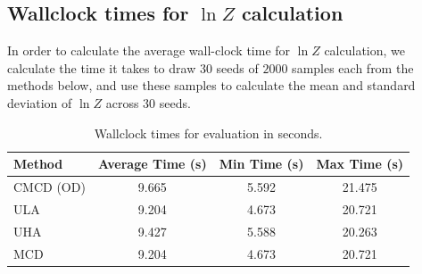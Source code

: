 \subsection{Wallclock times for \texorpdfstring{$\ln Z$}{ln Z} calculation}
In order to calculate the average wall-clock time for $\ln Z$ calculation, we calculate the time it takes to draw $30$ seeds of $2000$ samples each from the methods below, and use these samples to calculate the mean and standard deviation of $\ln Z$ across $30$ seeds.
\begin{table}[!htb]
    \centering
    \begin{tabular}{lccc}
\toprule Method & Average Time (s) & Min Time (s) & Max Time (s) \\
\midrule CMCD (OD) & 9.665 & 5.592 & 21.475 \\
 ULA & 9.204 & 4.673 & 20.721 \\
 UHA & 9.427 & 5.588 & 20.263 \\
 MCD & 9.204 & 4.673 & 20.721  \\
\bottomrule
\end{tabular}
    \caption{Wallclock times for evaluation in seconds.}
    \label{tab:my_label}
\end{table}


\begin{table}[!htb]
\centering
{}
\caption[Sampling and loss calculation complexity across SDE based methods]{Sampling and loss calculation complexity across SDE based methods,  $K$ represents the number of integration steps, $G(d)$ represents the cost of evaluating the score of the target and $N(d)$ for evaluating the drift/score networks both quantities are dimension dependant. PIS and DDS have an additional grad network cost $N_2$ which is dimension independant.}
\end{table}

